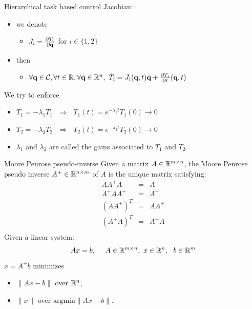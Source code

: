 %
%

\begin{frame} {Hierarchical task based control}
  Jacobian:
  \begin{itemize}
  \item we denote
    \begin{itemize}
      \item $J_i = \frac{\partial T_i}{\partial \textbf{q}}$ for $i\in\{1,2\}$
  \end{itemize}
    \pause
  \item then
    \begin{itemize}
    \item $\forall\textbf{q}\in{\cal C},\forall t\in\mathbb{R}, \forall\dot{\textbf{q}}\in\mathbb{R}^n,\ \dot{T}_i = J_i(\textbf{q}, t) \dot{\textbf{q}} + \frac{\partial T_i}{\partial t} (\textbf{q}, t)$
    \end{itemize}
  \end{itemize}
  \pause
  We try to enforce
  \begin{itemize}
    \item $\dot{T}_1 = - \lambda_1 T_1\ \ \ \Rightarrow\ \ \ T_1(t) = e^{-\lambda_1 t}T_1(0)\rightarrow 0$
      \pause
    \item $\dot{T}_2 = - \lambda_2 T_2\ \ \ \Rightarrow\ \ \ T_2(t) = e^{-\lambda_2 t}T_2(0)\rightarrow 0$
      \pause
    \item $\lambda_1$ and $\lambda_2$ are called the gains associated to $T_1$ and $T_2$.
  \end{itemize}
\end{frame}

%
%

\begin{frame} {Moore Penrose pseudo-inverse}
  Given a matrix $A\in\mathbb{R}^{m\times n}$, the Moore Penrose pseudo inverse $A^+\in\mathbb{R}^{n\times m}$ of $A$ is the unique matrix satisfying:
  \begin{eqnarray*}
    A A^{+} A &=& A \\
    A^{+} A A^{+} &=& A^{+} \\
    (AA^{+})^T &=& AA^{+} \\
    (A^{+}A)^T &=& A^{+}A \\
  \end{eqnarray*}
  \pause
  Given a linear system:
  $$A x = b,\ \ \ \ A\in\real^{m\times n},\ x\in\real^n,\ \ b\in\real^m $$
  $x=A^{+}b$ minimizes
  \pause
  \begin{itemize}
  \item $\|Ax-b\|$ over $\mathbb{R}^n$,
    \pause
  \item $\|x\|$ over $\mbox{argmin}\|Ax-b\|$.
  \end{itemize}
\end{frame}

